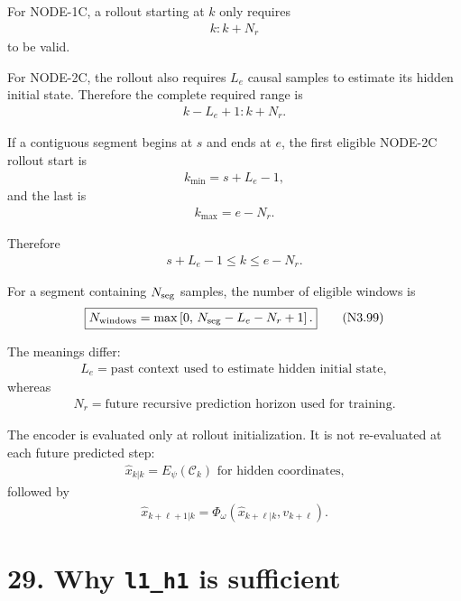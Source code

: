 \documentclass[11pt]{article}
\begin{document}
For NODE-1C, a rollout starting at \(k\) only requires
\begin{align}
\boxed{k:k+N_r}
\tag{N3.94}
\end{align}
to be valid.

For NODE-2C, the rollout also requires \(L_e\) causal samples to estimate its hidden initial state. Therefore the complete required range is
\begin{align}
\boxed{
k-L_e+1:k+N_r.
}
\tag{N3.95}
\end{align}

If a contiguous segment begins at \(s\) and ends at \(e\), the first eligible NODE-2C rollout start is
\begin{align}
\boxed{k_{\min}=s+L_e-1,}
\tag{N3.96}
\end{align}
and the last is
\begin{align}
\boxed{k_{\max}=e-N_r.}
\tag{N3.97}
\end{align}

Therefore
\begin{align}
\boxed{
s+L_e-1\le k\le e-N_r.
}
\tag{N3.98}
\end{align}

For a segment containing \(N_{\rm seg}\) samples, the number of eligible windows is
\begin{align}
\boxed{
N_{\rm windows}
=
\max\left[
0,\,
N_{\rm seg}-L_e-N_r+1
\right].
}
\tag{N3.99}
\end{align}

The meanings differ:
\begin{align}
\boxed{
L_e=\text{past context used to estimate hidden initial state},
}
\tag{N3.100}
\end{align}
whereas
\begin{align}
\boxed{
N_r=\text{future recursive prediction horizon used for training}.
}
\tag{N3.101}
\end{align}

The encoder is evaluated only at rollout initialization. It is not re-evaluated at each future predicted step:
\begin{align}
\boxed{
\widehat x_{k|k}
=
E_\psi(\mathcal C_k)
\text{ for hidden coordinates,}
}
\tag{N3.102}
\end{align}
followed by
\begin{align}
\boxed{
\widehat x_{k+\ell+1|k}
=
\Phi_\omega
(\widehat x_{k+\ell|k},v_{k+\ell}).
}
\tag{N3.103}
\end{align}

\section*{29. Why \texttt{l1\_h1} is sufficient}
\end{document}
